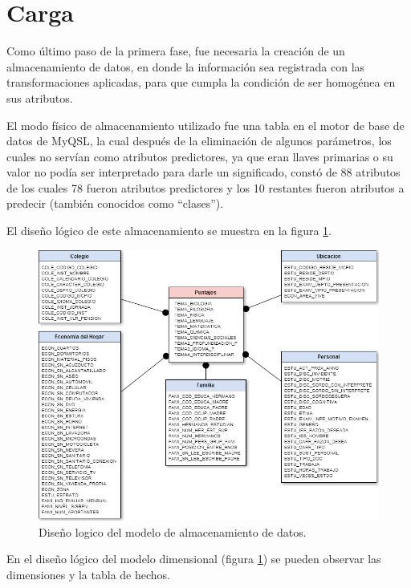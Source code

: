 \section{Carga}
Como último paso de la primera fase, fue necesaria la creación de un almacenamiento de datos, en donde la información sea registrada con las transformaciones aplicadas, para que cumpla la condición de ser homogénea en sus atributos.

El modo físico de almacenamiento utilizado fue una tabla en el motor de base de datos de MyQSL, la cual después de la eliminación de algunos parámetros, los cuales no servían como atributos predictores, ya que eran llaves primarias o su valor no podía ser interpretado para darle un significado, constó de 88 atributos de los cuales 78 fueron atributos predictores y los 10 restantes fueron atributos a predecir (también conocidos como ``clases'').

El diseño lógico de este almacenamiento se muestra en la figura \ref{fig:figura2}.

\begin{figure}[!htb]
\begin{centering}
\includegraphics[scale=0.65]{datamart}
\par\end{centering}
\caption{Diseño logico del modelo de almacenamiento de datos.}
\label{fig:figura2}
\end{figure}
En el diseño lógico del modelo dimensional (figura \ref{fig:figura2}) se pueden observar las dimensiones y la tabla de hechos.

